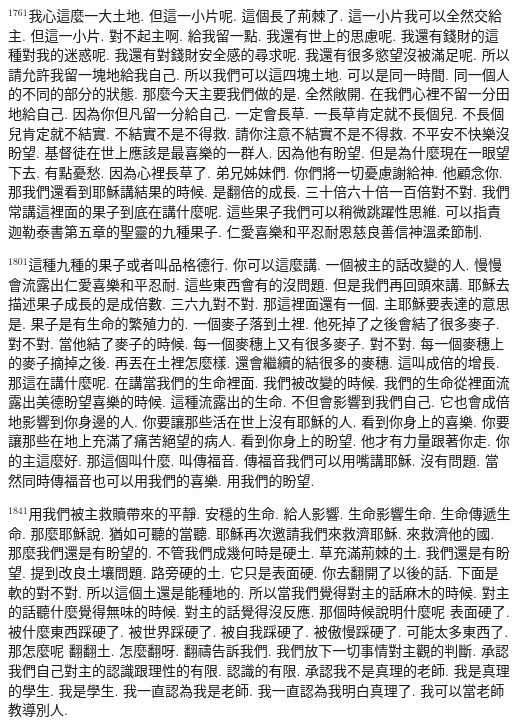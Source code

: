 \documentclass{book}
\begin{document}
$^{1761}$我心這麼一大土地.
但這一小片呢.
這個長了荊棘了.
這一小片我可以全然交給主.
但這一小片.
對不起主啊.
給我留一點.
我還有世上的思慮呢.
我還有錢財的這種對我的迷惑呢.
我還有對錢財安全感的尋求呢.
我還有很多慾望沒被滿足呢.
所以請允許我留一塊地給我自己.
所以我們可以這四塊土地.
可以是同一時間.
同一個人的不同的部分的狀態.
那麼今天主要我們做的是.
全然敞開.
在我們心裡不留一分田地給自己.
因為你但凡留一分給自己.
一定會長草.
一長草肯定就不長個兒.
不長個兒肯定就不結實.
不結實不是不得救.
請你注意不結實不是不得救.
不平安不快樂沒盼望.
基督徒在世上應該是最喜樂的一群人.
因為他有盼望.
但是為什麼現在一眼望下去.
有點憂愁.
因為心裡長草了.
弟兄姊妹們.
你們將一切憂慮謝給神.
他顧念你.
那我們還看到耶穌講結果的時候.
是翻倍的成長.
三十倍六十倍一百倍對不對.
我們常講這裡面的果子到底在講什麼呢.
這些果子我們可以稍微跳躍性思維.
可以指責迦勒泰書第五章的聖靈的九種果子.
仁愛喜樂和平忍耐恩慈良善信神溫柔節制.

$^{1801}$這種九種的果子或者叫品格德行.
你可以這麼講.
一個被主的話改變的人.
慢慢會流露出仁愛喜樂和平忍耐.
這些東西會有的沒問題.
但是我們再回頭來講.
耶穌去描述果子成長的是成倍數.
三六九對不對.
那這裡面還有一個.
主耶穌要表達的意思是.
果子是有生命的繁殖力的.
一個麥子落到土裡.
他死掉了之後會結了很多麥子.
對不對.
當他結了麥子的時候.
每一個麥穗上又有很多麥子.
對不對.
每一個麥穗上的麥子摘掉之後.
再丟在土裡怎麼樣.
還會繼續的結很多的麥穗.
這叫成倍的增長.
那這在講什麼呢.
在講當我們的生命裡面.
我們被改變的時候.
我們的生命從裡面流露出美德盼望喜樂的時候.
這種流露出的生命.
不但會影響到我們自己.
它也會成倍地影響到你身邊的人.
你要讓那些活在世上沒有耶穌的人.
看到你身上的喜樂.
你要讓那些在地上充滿了痛苦絕望的病人.
看到你身上的盼望.
他才有力量跟著你走.
你的主這麼好.
那這個叫什麼.
叫傳福音.
傳福音我們可以用嘴講耶穌.
沒有問題.
當然同時傳福音也可以用我們的喜樂.
用我們的盼望.

$^{1841}$用我們被主救贖帶來的平靜.
安穩的生命.
給人影響.
生命影響生命.
生命傳遞生命.
那麼耶穌說.
猶如可聽的當聽.
耶穌再次邀請我們來救濟耶穌.
來救濟他的國.
那麼我們還是有盼望的.
不管我們成幾何時是硬土.
草充滿荊棘的土.
我們還是有盼望.
提到改良土壤問題.
路旁硬的土.
它只是表面硬.
你去翻開了以後的話.
下面是軟的對不對.
所以這個土還是能種地的.
所以當我們覺得對主的話麻木的時候.
對主的話聽什麼覺得無味的時候.
對主的話覺得沒反應.
那個時候說明什麼呢 表面硬了.
被什麼東西踩硬了.
被世界踩硬了.
被自我踩硬了.
被傲慢踩硬了.
可能太多東西了.
那怎麼呢 翻翻土.
怎麼翻呀.
翻禱告訴我們.
我們放下一切事情對主觀的判斷.
承認我們自己對主的認識跟理性的有限.
認識的有限.
承認我不是真理的老師.
我是真理的學生.
我是學生.
我一直認為我是老師.
我一直認為我明白真理了.
我可以當老師教導別人.
\end{document}
